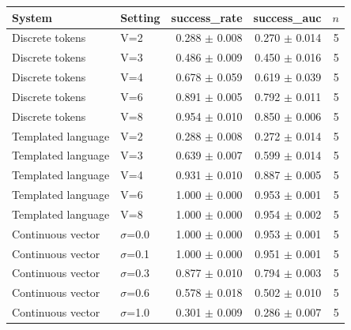 \begin{tabular}{llrrr}\toprule System & Setting & success\_rate & success\_auc & $n$ \\\midrule
Discrete tokens & V=2 & 0.288 $\pm$ 0.008 & 0.270 $\pm$ 0.014 & 5 \\
Discrete tokens & V=3 & 0.486 $\pm$ 0.009 & 0.450 $\pm$ 0.016 & 5 \\
Discrete tokens & V=4 & 0.678 $\pm$ 0.059 & 0.619 $\pm$ 0.039 & 5 \\
Discrete tokens & V=6 & 0.891 $\pm$ 0.005 & 0.792 $\pm$ 0.011 & 5 \\
Discrete tokens & V=8 & 0.954 $\pm$ 0.010 & 0.850 $\pm$ 0.006 & 5 \\
Templated language & V=2 & 0.288 $\pm$ 0.008 & 0.272 $\pm$ 0.014 & 5 \\
Templated language & V=3 & 0.639 $\pm$ 0.007 & 0.599 $\pm$ 0.014 & 5 \\
Templated language & V=4 & 0.931 $\pm$ 0.010 & 0.887 $\pm$ 0.005 & 5 \\
Templated language & V=6 & 1.000 $\pm$ 0.000 & 0.953 $\pm$ 0.001 & 5 \\
Templated language & V=8 & 1.000 $\pm$ 0.000 & 0.954 $\pm$ 0.002 & 5 \\
\midrule
Continuous vector & $\sigma$=0.0 & 1.000 $\pm$ 0.000 & 0.953 $\pm$ 0.001 & 5 \\
Continuous vector & $\sigma$=0.1 & 1.000 $\pm$ 0.000 & 0.951 $\pm$ 0.001 & 5 \\
Continuous vector & $\sigma$=0.3 & 0.877 $\pm$ 0.010 & 0.794 $\pm$ 0.003 & 5 \\
Continuous vector & $\sigma$=0.6 & 0.578 $\pm$ 0.018 & 0.502 $\pm$ 0.010 & 5 \\
Continuous vector & $\sigma$=1.0 & 0.301 $\pm$ 0.009 & 0.286 $\pm$ 0.007 & 5 \\
\bottomrule\end{tabular}
